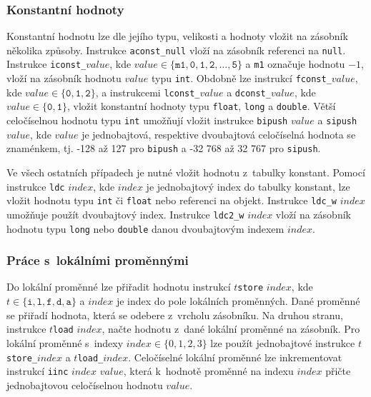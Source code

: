 \subsubsection{Konstantní hodnoty}

Konstantní hodnotu lze dle jejího typu, velikosti a hodnoty vložit na zásobník několika způsoby.
Instrukce \texttt{aconst\_null} vloží na zásobník referenci na \texttt{null}. 
Instrukce \texttt{iconst\_}$value$, kde $value \in \{ \texttt{m1}, \texttt{0}, \texttt{1}, \texttt{2}, \dots, \texttt{5}\}$ a \texttt{m1} označuje hodnotu $-1$, vloží na zásobník hodnotu $value$ typu \texttt{int}. Obdobně lze instrukcí \texttt{fconst\_}$value$, kde $value \in \{\texttt{0}, \texttt{1}, \texttt{2}\}$, a instrukcemi \texttt{lconst\_}$value$ a \texttt{dconst\_}$value$, kde $value \in \{\texttt{0}, \texttt{1}\}$, vložit konstantní hodnoty typu \texttt{float}, \texttt{long} a \texttt{double}. 
Větší celočíselnou hodnotu typu \texttt{int} umožňují vložit instrukce \texttt{bipush} $value$ a \texttt{sipush} $value$, kde $value$ je jednobajtová, respektive dvoubajtová celočíselná hodnota se znaménkem, tj. -128 až 127 pro \texttt{bipush} a -32 768 až 32 767 pro \texttt{sipush}.

Ve všech ostatních případech je nutné vložit hodnotu z~tabulky konstant. Pomocí instrukce \texttt{ldc} $index$, kde $index$ je jednobajtový index do tabulky konstant, lze vložit hodnotu typu \texttt{int} či \texttt{float} nebo referenci na objekt. Instrukce \texttt{ldc\_w} $index$ umožňuje použít dvoubajtový index. Instrukce \texttt{ldc2\_w} $index$ vloží na zásobník hodnotu typu \texttt{long} nebo \texttt{double} danou dvoubajtovým indexem  $index$.

\subsubsection{Práce s~lokálními proměnnými}

Do lokální proměnné lze přiřadit hodnotu instrukcí $t$\texttt{store} $index$, kde $t \in \{ \texttt{i}, \texttt{l}, \texttt{f}, \texttt{d}, \texttt{a} \}$ a $index$ je index do pole lokálních proměnných. Dané proměnné se přiřadí hodnota, která se odebere z~vrcholu zásobníku. Na druhou stranu, instrukce $t$\texttt{load} $index$, načte hodnotu z~dané lokální proměnné na zásobník. Pro lokální proměnné s~indexy $index \in \{0,1,2,3\}$ lze použít jednobajtové instrukce $t$\texttt{store\_}$index$ a $t$\texttt{load\_}$index$.
Celočíselné lokální proměnné lze inkrementovat instrukcí \texttt{iinc} $index$ $value$, která k~hodnotě proměnné na indexu $index$ přičte jednobajtovou celočíselnou hodnotu $value$.

